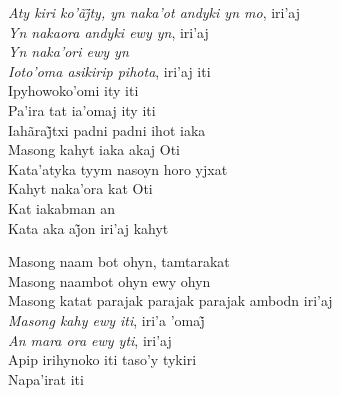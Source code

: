 \smallskip
 \begin{center}\end{center}
 \smallskip
\noindent \textit{Aty kiri ko’ãj̃ty, yn naka’ot andyki yn mo}, iri’aj\\
\textit{Yn nakaora andyki ewy yn}, iri'aj\\
\textit{Yn naka'ori ewy yn}\\
\textit{Ioto'oma asikirip pihota}, iri'aj iti\\
Ipyhowoko'omi ity iti\\
Pa'ira tat ia'omaj ity iti\\
Iahãraj̃txi padni padni ihot iaka\\
Masong kahyt iaka akaj Oti\\
Kata'atyka tyym nasoyn horo yjxat\\
Kahyt naka'ora kat Oti\\
Kat iakabman an\\
Kata aka aj̃on iri’aj kahyt

\smallskip
 \begin{center}\end{center}
 \smallskip
\noindent Masong naam bot ohyn, tamtarakat\\
Masong naambot ohyn ewy ohyn\\
Masong katat parajak parajak parajak ambodn iri'aj\\
\textit{Masong kahy ewy iti}, iri’a ’omaj̃\\
\textit{An mara ora ewy yti}, iri'aj\\
Apip irihynoko iti taso'y tykiri\\
Napa'irat iti

